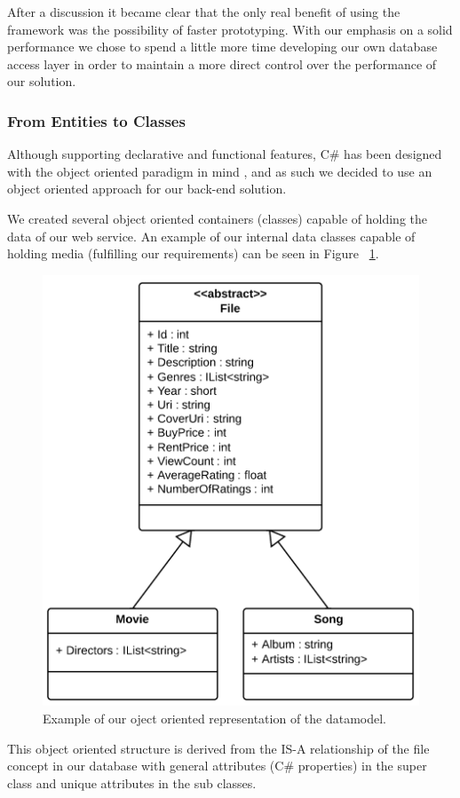After a discussion it became clear that the only real benefit of using the framework was the possibility of faster prototyping. With our emphasis on a solid performance we chose to spend a little more time developing our own database access layer in order to maintain a more direct control over the performance of our solution.


\subsubsection{From Entities to Classes}
Although supporting declarative and functional features, C\# has been designed with the object oriented paradigm in mind \cite{csharpecma}, and as such we decided to use an object oriented approach for our back-end solution. 

We created several object oriented containers (classes) capable of holding the data of our web service. An example of our internal data classes capable of holding media (fulfilling our requirements) can be seen in Figure ~\ref{fig:orm}.
\begin{figure}[hbt]
	\centering
	\includegraphics[scale=0.7]{./p1design/orm.png}
	\caption{Example of our oject oriented representation of the datamodel.}
	\label{fig:orm}
\end{figure}

This object oriented structure is derived from the IS-A relationship of the file concept in our database with general attributes (C\# properties) in the super class and unique attributes in the sub classes.

